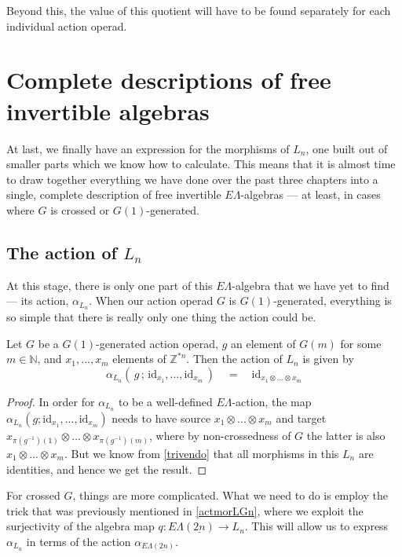 \documentclass{amsbook} %
\newcommand{\ELnn}{E\Lambda(\underline{2n})}
\numberwithin{section}{chapter}
\begin{document}
Beyond this, the value of this quotient will have to be found separately for each individual action operad. 

\chapter{Complete descriptions of free invertible algebras}
\label{mainthm}

At last, we finally have an expression for the morphisms of $L_n$, one built out of smaller parts which we know how to calculate. This means that it is almost time to draw together everything we have done over the past three chapters into a single, complete description of free invertible $E\Lambda$-algebras --- at least, in cases where $G$ is crossed or $G(1)$-generated. 

\section{The action of \texorpdfstring{$L_n$}{L_n}}

At this stage, there is only one part of this $E\Lambda$-algebra that we have yet to find --- its action, $\alpha_{L_n}$. When our action operad $G$ is $G(1)$-generated, everything is so simple that there is really only one thing the action could be.

\begin{lem} \label{G1act} Let $G$ be a $G(1)$-generated action operad, $g$ an element of $G(m)$ for some $m \in \mathbb{N}$, and $x_1, ..., x_m$ elements of $\mathbb{Z}^{\ast n}$. Then the action of $L_n$ is given by
\[ \alpha_{L_n}( \, g \, ; \, \mathrm{id}_{x_1}, ..., \mathrm{id}_{x_m} \, ) \quad = \quad \mathrm{id}_{x_1 \otimes ... \otimes x_m} \]
\end{lem}
\begin{proof}
In order for $\alpha_{L_n}$ to be a well-defined $E\Lambda$-action, the map $\alpha_{L_n}(g; \mathrm{id}_{x_1}, ..., \mathrm{id}_{x_m})$ needs to have source $x_1 \otimes ... \otimes x_m$ and target $x_{\pi(g^{-1})(1)} \otimes ... \otimes x_{\pi(g^{-1})(m)}$, where by non-crossedness of $G$ the latter is also $x_1 \otimes ... \otimes x_m$. But we know from \cref{trivendo} that all morphisms in this $L_n$ are identities, and hence we get the result.
\end{proof}

For crossed $G$, things are more complicated. What we need to do is employ the trick that was previously mentioned in \cref{actmorLGn}, where we exploit the surjectivity of the algebra map $q: \ELnn \to L_n$. This will allow us to express $\alpha_{L_n}$ in terms of the action $\alpha_{\ELnn}$. 
\end{document}
